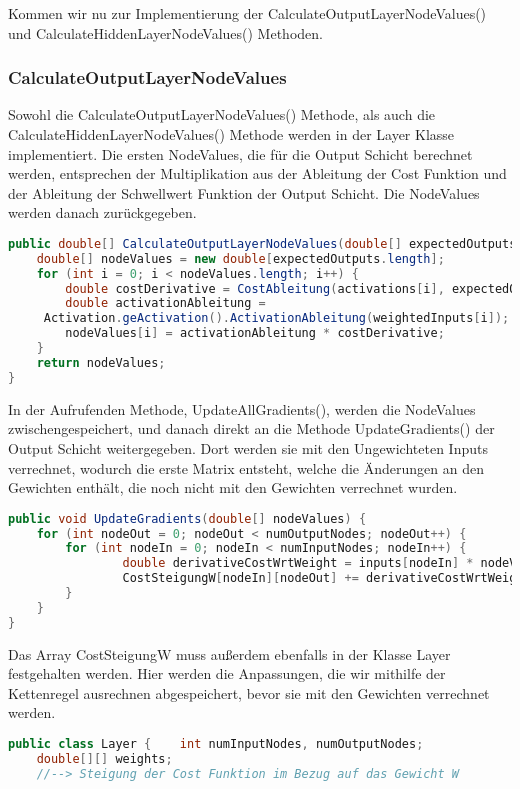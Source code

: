 \documentclass[12pt]{article}
\begin{document}
Kommen wir nu zur Implementierung der CalculateOutputLayerNodeValues() und CalculateHiddenLayerNodeValues() Methoden.\subsubsection{ CalculateOutputLayerNodeValues}Sowohl die CalculateOutputLayerNodeValues() Methode, als auch die CalculateHiddenLayerNodeValues() Methode werden in der Layer Klasse implementiert.
Die ersten NodeValues, die für die Output Schicht berechnet werden, entsprechen der Multiplikation aus der Ableitung der Cost Funktion und der Ableitung der Schwellwert Funktion der Output Schicht.
Die NodeValues werden danach zurückgegeben.\begin{lstlisting}[language=Java]
public double[] CalculateOutputLayerNodeValues(double[] expectedOutputs) {
    double[] nodeValues = new double[expectedOutputs.length];
    for (int i = 0; i < nodeValues.length; i++) {
        double costDerivative = CostAbleitung(activations[i], expectedOutputs[i]);
        double activationAbleitung = 
     Activation.geActivation().ActivationAbleitung(weightedInputs[i]);
        nodeValues[i] = activationAbleitung * costDerivative;
    }
    return nodeValues;
}
\end{lstlisting}In der Aufrufenden Methode, UpdateAllGradients(), werden die NodeValues zwischengespeichert, und danach direkt an die Methode UpdateGradients() der Output Schicht weitergegeben. Dort werden sie mit den Ungewichteten Inputs verrechnet, wodurch die erste Matrix entsteht, welche die Änderungen an den Gewichten enthält, die noch nicht mit den Gewichten verrechnet wurden.\begin{lstlisting}[language=Java]
public void UpdateGradients(double[] nodeValues) {
    for (int nodeOut = 0; nodeOut < numOutputNodes; nodeOut++) {
        for (int nodeIn = 0; nodeIn < numInputNodes; nodeIn++) {
	            double derivativeCostWrtWeight = inputs[nodeIn] * nodeValues[nodeOut];
	            CostSteigungW[nodeIn][nodeOut] += derivativeCostWrtWeight;
        }
    }
}
\end{lstlisting}Das Array CostSteigungW muss außerdem ebenfalls in der Klasse Layer festgehalten werden. Hier werden die Anpassungen, die wir mithilfe der Kettenregel ausrechnen abgespeichert, bevor sie mit den Gewichten verrechnet werden.\begin{lstlisting}[language=Java]
public class Layer {    int numInputNodes, numOutputNodes;
    double[][] weights;
    //--> Steigung der Cost Funktion im Bezug auf das Gewicht W

\end{lstlisting}
\end{document}
